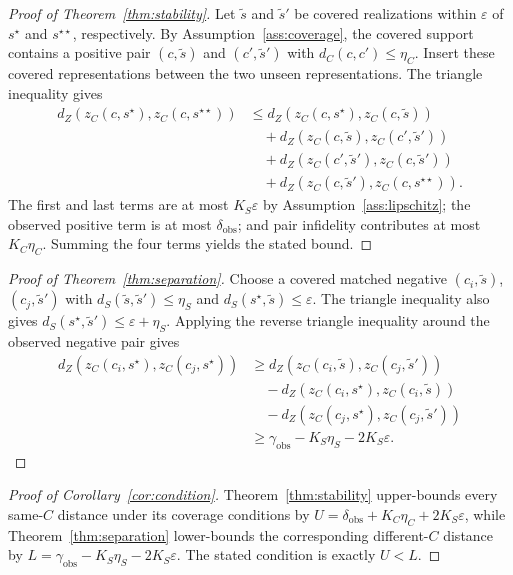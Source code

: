 \documentclass[11pt]{article}
\newcommand{\zC}{z_C}
\newcommand{\dC}{d_C}
\newcommand{\dS}{d_S}
\newcommand{\dZ}{d_Z}
\begin{document}
\begin{proof}[Proof of Theorem~\ref{thm:stability}]
Let $\tilde{s}$ and $\tilde{s}'$ be covered realizations within $\varepsilon$ of $s^\star$ and $s^{\star\star}$, respectively. By Assumption~\ref{ass:coverage}, the covered support contains a positive pair $(c,\tilde{s})$ and $(c',\tilde{s}')$ with $\dC(c,c')\leq\eta_C$. Insert these covered representations between the two unseen representations. The triangle inequality gives
\begin{align}
\dZ(\zC(c,s^\star),\zC(c,s^{\star\star}))
&\leq \dZ(\zC(c,s^\star),\zC(c,\tilde{s}))\\
&\quad{}+\dZ(\zC(c,\tilde{s}),\zC(c',\tilde{s}'))\\
&\quad{}+\dZ(\zC(c',\tilde{s}'),\zC(c,\tilde{s}'))\\
&\quad{}+\dZ(\zC(c,\tilde{s}'),\zC(c,s^{\star\star})).
\end{align}
The first and last terms are at most $K_S\varepsilon$ by Assumption~\ref{ass:lipschitz}; the observed positive term is at most $\delta_{\mathrm{obs}}$; and pair infidelity contributes at most $K_C\eta_C$. Summing the four terms yields the stated bound.
\end{proof}

\begin{proof}[Proof of Theorem~\ref{thm:separation}]
Choose a covered matched negative $(c_i,\tilde{s})$, $(c_j,\tilde{s}')$ with $\dS(\tilde{s},\tilde{s}')\leq\eta_S$ and $\dS(s^\star,\tilde{s})\leq\varepsilon$. The triangle inequality also gives $\dS(s^\star,\tilde{s}')\leq\varepsilon+\eta_S$. Applying the reverse triangle inequality around the observed negative pair gives
\begin{align}
\dZ(\zC(c_i,s^\star),\zC(c_j,s^\star))
&\geq \dZ(\zC(c_i,\tilde{s}),\zC(c_j,\tilde{s}'))\\
&\quad{}-\dZ(\zC(c_i,s^\star),\zC(c_i,\tilde{s}))\\
&\quad{}-\dZ(\zC(c_j,s^\star),\zC(c_j,\tilde{s}'))\\
&\geq \gamma_{\mathrm{obs}}-K_S\eta_S-2K_S\varepsilon.
\end{align}
\end{proof}

\begin{proof}[Proof of Corollary~\ref{cor:condition}]
Theorem~\ref{thm:stability} upper-bounds every same-$C$ distance under its coverage conditions by $U=\delta_{\mathrm{obs}}+K_C\eta_C+2K_S\varepsilon$, while Theorem~\ref{thm:separation} lower-bounds the corresponding different-$C$ distance by $L=\gamma_{\mathrm{obs}}-K_S\eta_S-2K_S\varepsilon$. The stated condition is exactly $U<L$.
\end{proof}
\end{document}
